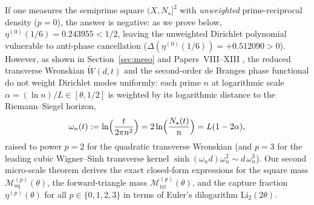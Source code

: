 \documentclass[11pt,reqno]{amsart}
\theoremstyle{definition}
\theoremstyle{remark}
\numberwithin{equation}{section}
\newcommand{\Li}{\mathrm{Li}}
\newcommand{\tri}{\mathrm{tri}}
\newcommand{\sq}{\mathrm{sq}}
\begin{document}
If one measures the semiprime square $(X,N_\star]^2$ with \emph{unweighted} prime-reciprocal density ($p=0$), the answer is negative: as we prove below, $\eta^{(0)}(1/6) = 0.243955 < 1/2$, leaving the unweighted Dirichlet polynomial vulnerable to anti-phase cancellation ($\Delta(\eta^{(0)}(1/6)) = +0.512090 > 0$). However, as shown in Section~\ref{sec:meso} and Papers~VIII--XIII \cite{Missiaen2026P8,Missiaen2026P12,Missiaen2026P13}, the reduced transverse Wronskian $\widetilde{W}(d,t)$ and the second-order de Branges phase functional do not weight Dirichlet modes uniformly: each prime $n$ at logarithmic scale $\alpha = (\ln n)/L \in [\theta,1/2]$ is weighted by its logarithmic distance to the Riemann--Siegel horizon,
\begin{equation}\label{eq:omega-weight-def}
\omega_n(t) := \ln\Bigl(\frac{t}{2\pi n^2}\Bigr) = 2\ln\Bigl(\frac{N_\star(t)}{n}\Bigr) = L(1 - 2\alpha),
\end{equation}
raised to power $p=2$ for the quadratic transverse Wronskian (and $p=3$ for the leading cubic Wigner--Sinh transverse kernel $\sinh(\omega_n d)\omega_n^2 \sim d\,\omega_n^3$). Our second micro-scale theorem derives the exact closed-form expressions for the square mass $\mathcal{M}_{\sq}^{(p)}(\theta)$, the forward-triangle mass $\mathcal{M}_{\tri}^{(p)}(\theta)$, and the capture fraction $\eta^{(p)}(\theta)$ for all $p \in \{0,1,2,3\}$ in terms of Euler's dilogarithm $\Li_2(2\theta)$.
\end{document}
